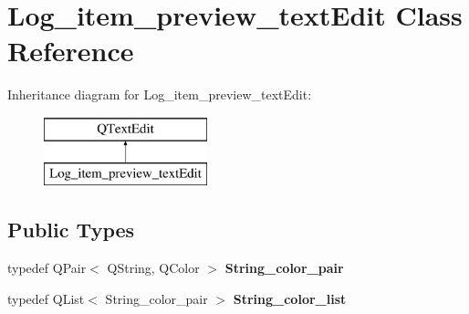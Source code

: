 \hypertarget{class_log__item__preview__text_edit}{\section{Log\-\_\-item\-\_\-preview\-\_\-text\-Edit Class Reference}
\label{class_log__item__preview__text_edit}
}
Inheritance diagram for Log\-\_\-item\-\_\-preview\-\_\-text\-Edit\-:\begin{figure}[H]
\begin{center}
\leavevmode
\includegraphics[height=2.000000cm]{class_log__item__preview__text_edit}
\end{center}
\end{figure}
\subsection*{Public Types}
\begin{DoxyCompactItemize}
\item 
\hypertarget{class_log__item__preview__text_edit_a21369eab2c7fe8d8dd3e3c3411f0b6e4}{typedef Q\-Pair$<$ Q\-String, Q\-Color $>$ {\bfseries String\-\_\-color\-\_\-pair}}\label{class_log__item__preview__text_edit_a21369eab2c7fe8d8dd3e3c3411f0b6e4}

\item 
\hypertarget{class_log__item__preview__text_edit_a2e558af15bd3237aadfe8c594c600c3d}{typedef Q\-List$<$ String\-\_\-color\-\_\-pair $>$ {\bfseries String\-\_\-color\-\_\-list}}\label{class_log__item__preview__text_edit_a2e558af15bd3237aadfe8c594c600c3d}

\end{DoxyCompactItemize}
